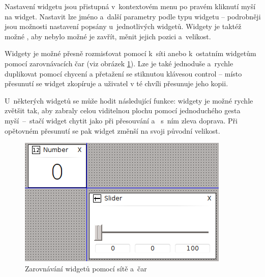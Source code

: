 \documentclass[12pt, a4paper, oneside]{article}
\begin{document}
Nastavení widgetu jsou přistupná v~kontextovém menu po pravém kliknutí myší na widget. Nastavit lze jméno a~další parametry podle typu widgetu -- podrobněji jsou možnosti nastavení popsány u~jednotlivých widgetů. Widgety je taktéž možné , aby nebylo možné je zavřít, měnit jejich pozici a~velikost.

Widgety je možné přesně rozmisťovat pomocí  k~síti anebo k~ostatním widgetům pomocí zarovnávacích čar (viz obrázek \ref{widget_lines}). Lze je také jednoduše a~rychle duplikovat pomocí chycení a přetažení se stiknutou klávesou control -- místo přesunutí se widget zkopíruje a uživatel v té chvíli přesunuje jeho kopii.

U~některých widgetů se může hodit následující funkce: widgety je možné rychle zvětšit tak, aby zabraly celou viditelnou plochu pomocí jednoduchého  gesta myší~--~stačí widget chytit jako při přesouvání a~ s~ním zleva doprava. Při opětovném přesunutí se pak widget změnší na svoji původní velikost.

\begin{figure}[H]
\begin{center}
\includegraphics[scale=1]{img/lines.png}
\caption{Zarovnávání widgetů pomocí sítě a~čar}
\label{widget_lines}
\end{center}
\end{figure}
\end{document}

